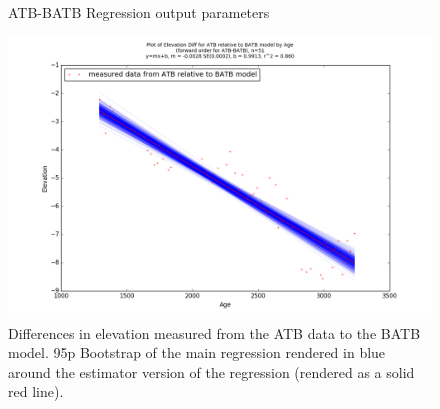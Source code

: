 \begin{figure}[H]
	\begin{flushleft}
	\end{flushleft}
	\caption{ATB-BATB Regression output parameters}
	\label{fig:ATBxBATB_regression}
\end{figure}

\newpage

\begin{figure}[H]
	\includegraphics[width=1.7\linewidth, angle=270 ]{data/bothNonZero/withinSeventyFivePercent/gias/theGIA_ATB_relative_to_BATB.png}
	\caption{Differences in elevation measured from the ATB data to the BATB model. 95p Bootstrap of the main regression rendered in blue around the estimator version of the regression (rendered as a solid red line).}
	\label{fig:gias_ATBxBATB}
\end{figure}


